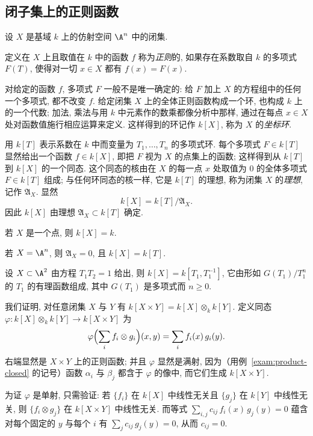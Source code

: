 \subsection{闭子集上的正则函数}

设 $X$ 是基域 $k$ 上的仿射空间 $\A^n$ 中的闭集.

\begin{definition}[正则函数]\label{def:regular-function}
	定义在 $X$ 上且取值在 $k$ 中的函数 $f$ 称为\emph{正则}的, 如果存在系数取自 $k$ 的多项式 $F(T)$, 使得对一切 $x \in X$ 都有 $f(x) = F(x)$.
\end{definition}

对给定的函数 $f$, 多项式 $F$ 一般不是唯一确定的: 给 $F$ 加上 $X$ 的方程组中的任何一个多项式, 都不改变 $f$. 给定闭集 $X$ 上的全体正则函数构成一个环, 也构成 $k$ 上的一个代数; 加法, 乘法与用 $k$ 中元素作的数乘都像分析中那样, 通过在每点 $x \in X$ 处对函数值施行相应运算来定义. 这样得到的环记作 $k[X]$, 称为 $X$ 的\emph{坐标环}.

用 $k[T]$ 表示系数在 $k$ 中而变量为 $T_1, \ldots, T_n$ 的多项式环. 每个多项式 $F \in k[T]$ 显然给出一个函数 $f \in k[X]$, 即把 $F$ 视为 $X$ 的点集上的函数; 这样得到从 $k[T]$ 到 $k[X]$ 的一个同态. 这个同态的核由在 $X$ 的每一点 $x$ 处取值为 $0$ 的全体多项式 $F \in k[T]$ 组成; 与任何环同态的核一样, 它是 $k[T]$ 的理想, 称为闭集 $X$ 的\emph{理想}, 记作 $\mathfrak A_X$. 显然
\[
	k[X] = k[T] / \mathfrak A_X.
\]
因此 $k[X]$ 由理想 $\mathfrak A_X \subset k[T]$ 确定.

\begin{example}\label{exam:point-ring}
	若 $X$ 是一个点, 则 $k[X] = k$.
\end{example}

\begin{example}\label{exam:An-ring}
	若 $X = \A^n$, 则 $\mathfrak A_X = 0$, 且 $k[X] = k[T]$.
\end{example}

\begin{example}\label{exam:hyperbola-ring}
	设 $X \subset \A^2$ 由方程 $T_1 T_2 = 1$ 给出, 则 $k[X] = k[T_1, T_1^{-1}]$, 它由形如 $G(T_1)/T_1^n$ 的 $T_1$ 的有理函数组成, 其中 $G(T_1)$ 是多项式而 $n \ge 0$.
\end{example}

\begin{example}\label{exam:tensor-product-ring}
	我们证明, 对任意闭集 $X$ 与 $Y$ 有 $k[X \times Y] = k[X] \otimes_k k[Y]$. 定义同态 $\varphi: k[X] \otimes_k k[Y] \to k[X \times Y]$ 为
	\[
		\varphi\Bigl( \sum_i f_i \otimes g_i \Bigr)(x, y) = \sum_i f_i(x)\, g_i(y).
	\]
	右端显然是 $X \times Y$ 上的正则函数; 并且 $\varphi$ 显然是满射, 因为（用例~\ref{exam:product-closed} 的记号）函数 $\alpha_i$ 与 $\beta_j$ 都含于 $\varphi$ 的像中, 而它们生成 $k[X \times Y]$.

	为证 $\varphi$ 是单射, 只需验证: 若 $\{f_i\}$ 在 $k[X]$ 中线性无关且 $\{g_j\}$ 在 $k[Y]$ 中线性无关, 则 $\{f_i \otimes g_j\}$ 在 $k[X \times Y]$ 中线性无关. 而等式 $\sum_{i,j} c_{ij}\, f_i(x)\, g_j(y) = 0$ 蕴含对每个固定的 $y$ 与每个 $i$ 有 $\sum_j c_{ij}\, g_j(y) = 0$, 从而 $c_{ij} = 0$.
\end{example}

